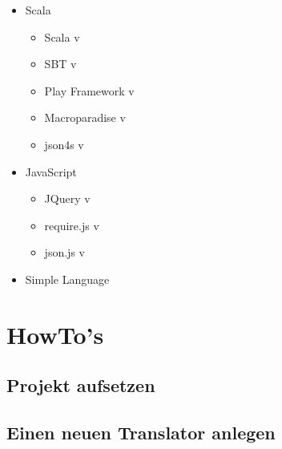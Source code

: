 \documentclass[12pt,bibtotoc]{scrreprt}
\begin{document}
\begin{itemize}
  \item{Scala}
  \begin{itemize}
    \item{Scala v}
    \item{SBT v}
    \item{Play Framework v}
    \item{Macroparadise v}
    \item{json4s v}
  \end{itemize}
  \item{JavaScript}
  \begin{itemize}
    \item{JQuery v}
    \item{require.js v}
    \item{json.js v}
  \end{itemize}
  \item{Simple Language}
\end{itemize}



\chapter{HowTo's}

\section{Projekt aufsetzen}
\label{sec:setup-project}

\section{Einen neuen Translator anlegen}
\label{sec:new-translator-class}

{}

\end{document}
